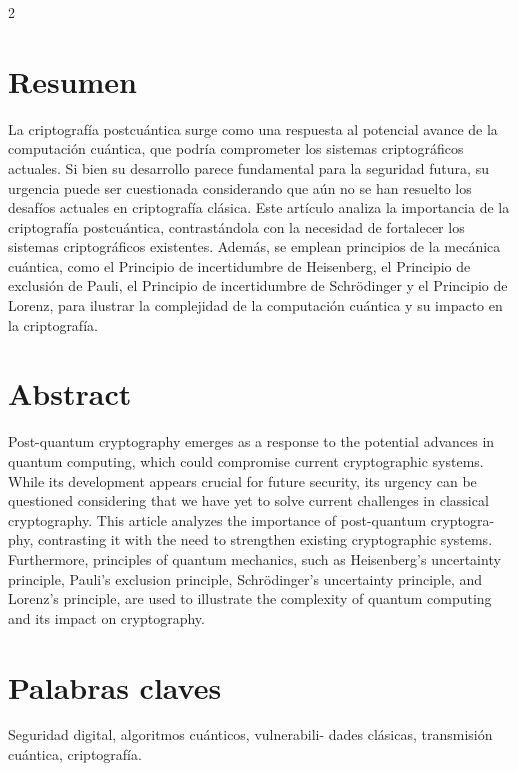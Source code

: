 \documentclass[12pt,spanish,Letterpaper,openany]{book}
\begin{document}
\begin {multicols}{2}

\hypertarget{resumen-8}{%
\section{Resumen}\label{resumen-8}}

La criptografía postcuántica surge como una respuesta al potencial avance de la computación cuántica, que podría comprometer los sistemas criptográficos actuales. Si bien su desarrollo parece fundamental para la seguridad futura, su urgencia puede ser cuestionada considerando que aún no se han resuelto los desafíos actuales en criptografía clásica. Este artículo analiza la importancia de la criptografía postcuántica, contrastándola con la necesidad de fortalecer los sistemas criptográficos existentes. Además, se emplean principios de la mecánica cuántica, como el Principio de incertidumbre de Heisenberg, el Principio de exclusión de Pauli, el Principio de incertidumbre de Schrödinger y el Principio de Lorenz, para ilustrar la complejidad de la computación cuántica y su impacto en la criptografía.

\hypertarget{abstract-8}{%
\section{Abstract}\label{abstract-8}}

Post-quantum cryptography emerges as a response to the potential advances in quantum computing, which could compromise current cryptographic systems. While its development appears crucial for future security, its urgency can be questioned considering that we have yet to solve current challenges in classical cryptography. This article analyzes the importance of post-quantum cryptogra-
phy, contrasting it with the need to strengthen existing cryptographic systems. Furthermore, principles of quantum mechanics, such as Heisenberg's uncertainty principle, Pauli's exclusion principle, Schrödinger's uncertainty principle, and Lorenz's principle, are used to illustrate the complexity of quantum computing and its impact on cryptography.

\hypertarget{palabras-claves-8}{%
\section{Palabras claves}\label{palabras-claves-8}}

Seguridad digital, algoritmos cuánticos, vulnerabili-
dades clásicas, transmisión cuántica, criptografía.


\end{multicols}
\end{document}
